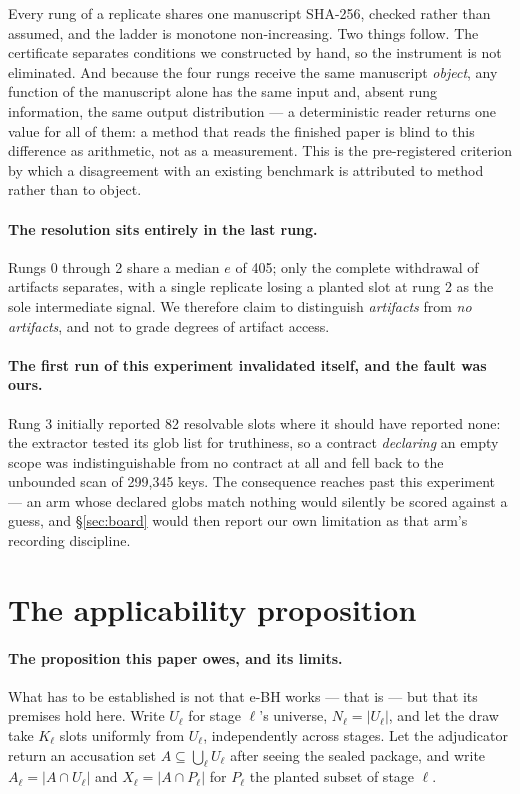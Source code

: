 \documentclass[10pt]{article}
\newcommand{\RM}[1]{{#1}}
\begin{document}
\noindent Every rung of a replicate shares one manuscript SHA-256, checked
rather than assumed, and the ladder is \RM{monotone non-increasing}. Two things
follow. The certificate separates conditions we constructed by hand, so the
instrument is not eliminated. And because the four rungs receive the same
manuscript \emph{object}, any function of the manuscript alone has the same
input and, absent rung information, the same output distribution --- a
deterministic reader returns one value
for all of them: a method that reads the finished paper is blind to this
difference as arithmetic, not as a measurement. This is the pre-registered
criterion by which a disagreement with an existing benchmark is attributed to
method rather than to object.

\paragraph{The resolution sits entirely in the last rung.} Rungs 0 through 2
share a median $e$ of \RM{405}; only the complete withdrawal of artifacts
separates, with a single replicate losing a planted slot at rung 2 as the sole
intermediate signal. We therefore claim to distinguish \emph{artifacts} from
\emph{no artifacts}, and not to grade degrees of artifact access.

\paragraph{The first run of this experiment invalidated itself, and the fault
was ours.} Rung 3 initially reported \RM{82} resolvable slots where it should
have reported none: the extractor tested its glob list for truthiness, so a
contract \emph{declaring} an empty scope was indistinguishable from no contract
at all and fell back to the unbounded scan of \RM{299{,}345} keys. The
consequence reaches past this experiment --- an arm whose declared globs match
nothing would silently be scored against a guess, and \S\ref{sec:board} would
then report our own limitation as that arm's recording discipline.



\section{The applicability proposition}
\label{app:proof}
\paragraph{The proposition this paper owes, and its limits.} What has to be
established is not that e-BH works --- that is \cite{ebh} --- but that its
premises hold here. Write $U_\ell$ for stage $\ell$'s universe, $N_\ell =
|U_\ell|$, and let the draw take $K_\ell$ slots uniformly from $U_\ell$,
independently across stages. Let the adjudicator return an accusation set $A
\subseteq \bigcup_\ell U_\ell$ after seeing the sealed package, and write
$A_\ell = |A \cap U_\ell|$ and $X_\ell = |A \cap P_\ell|$ for $P_\ell$ the
planted subset of stage $\ell$.
\end{document}
